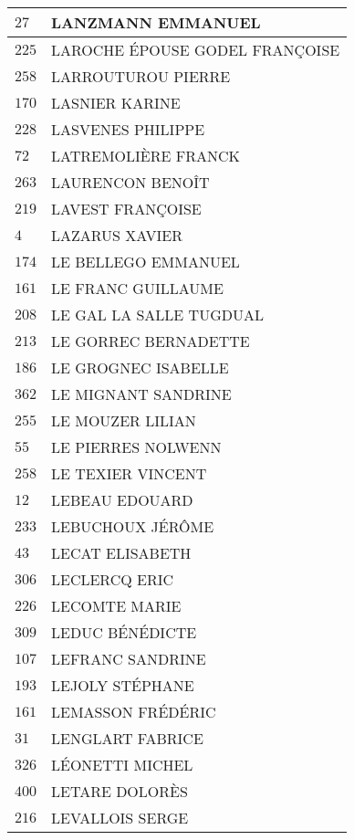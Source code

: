 \begin{xltabular}{\linewidth}{|l|X|}
    \hline
    $27$ & LANZMANN EMMANUEL \\
    \hline
    $225$ & LAROCHE ÉPOUSE GODEL FRANÇOISE \\
    \hline
    $258$ & LARROUTUROU PIERRE \\
    \hline
    $170$ & LASNIER KARINE \\
    \hline
    $228$ & LASVENES PHILIPPE \\
    \hline
    $72$ & LATREMOLIÈRE FRANCK \\
    \hline
    $263$ & LAURENCON BENOÎT \\
    \hline
    $219$ & LAVEST FRANÇOISE \\
    \hline
    $4$ & LAZARUS XAVIER \\
    \hline
    $174$ & LE BELLEGO EMMANUEL \\
    \hline
    $161$ & LE FRANC GUILLAUME \\
    \hline
    $208$ & LE GAL LA SALLE TUGDUAL \\
    \hline
    $213$ & LE GORREC BERNADETTE \\
    \hline
    $186$ & LE GROGNEC ISABELLE \\
    \hline
    $362$ & LE MIGNANT SANDRINE \\
    \hline
    $255$ & LE MOUZER LILIAN \\
    \hline
    $55$ & LE PIERRES NOLWENN \\
    \hline
    $258$ & LE TEXIER VINCENT \\
    \hline
    $12$ & LEBEAU EDOUARD \\
    \hline
    $233$ & LEBUCHOUX JÉRÔME \\
    \hline
    $43$ & LECAT ELISABETH \\
    \hline
    $306$ & LECLERCQ ERIC \\
    \hline
    $226$ & LECOMTE MARIE \\
    \hline
    $309$ & LEDUC BÉNÉDICTE \\
    \hline
    $107$ & LEFRANC SANDRINE \\
    \hline
    $193$ & LEJOLY STÉPHANE \\
    \hline
    $161$ & LEMASSON FRÉDÉRIC \\
    \hline
    $31$ & LENGLART FABRICE \\
    \hline
    $326$ & LÉONETTI MICHEL \\
    \hline
    $400$ & LETARE DOLORÈS \\
    \hline
    $216$ & LEVALLOIS SERGE \\
    \hline

\end{xltabular}
